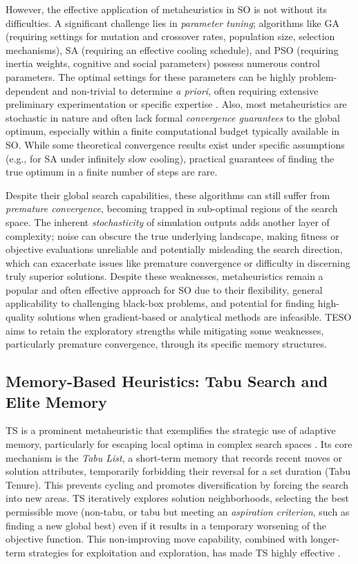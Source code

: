 \documentclass{article}
\begin{document}
However, the effective application of metaheuristics in SO is not without its difficulties. A significant challenge lies in \textit{parameter tuning}; algorithms like GA (requiring settings for mutation and crossover rates, population size, selection mechanisms), SA (requiring an effective cooling schedule), and PSO (requiring inertia weights, cognitive and social parameters) possess numerous control parameters. The optimal settings for these parameters can be highly problem-dependent and non-trivial to determine \textit{a priori}, often requiring extensive preliminary experimentation or specific expertise \cite{10408315}. Also, most metaheuristics are stochastic in nature and often lack formal \textit{convergence guarantees} to the global optimum, especially within a finite computational budget typically available in SO. While some theoretical convergence results exist under specific assumptions (e.g., for SA under infinitely slow cooling), practical guarantees of finding the true optimum in a finite number of steps are rare.

Despite their global search capabilities, these algorithms can still suffer from \textit{premature convergence}, becoming trapped in sub-optimal regions of the search space. The inherent \textit{stochasticity} of simulation outputs adds another layer of complexity; noise can obscure the true underlying landscape, making fitness or objective evaluations unreliable and potentially misleading the search direction, which can exacerbate issues like premature convergence or difficulty in discerning truly superior solutions. Despite these weaknesses, metaheuristics remain a popular and often effective approach for SO due to their flexibility, general applicability to challenging black-box problems, and potential for finding high-quality solutions when gradient-based or analytical methods are infeasible. TESO aims to retain the exploratory strengths while mitigating some weaknesses, particularly premature convergence, through its specific memory structures.



\subsection{Memory-Based Heuristics: Tabu Search and Elite Memory}  
\label{subsec:memory_heuristics_ts}  

TS is a prominent metaheuristic that exemplifies the strategic use of adaptive memory, particularly for escaping local optima in complex search spaces \cite{glover1990tabu}. Its core mechanism is the \textit{Tabu List}, a short-term memory that records recent moves or solution attributes, temporarily forbidding their reversal for a set duration (Tabu Tenure). This prevents cycling and promotes diversification by forcing the search into new areas. TS iteratively explores solution neighborhoods, selecting the best permissible move (non-tabu, or tabu but meeting an \textit{aspiration criterion}, such as finding a new global best) even if it results in a temporary worsening of the objective function. This non-improving move capability, combined with longer-term strategies for exploitation and exploration, has made TS highly effective \cite{Soykan2016}.
\end{document}
